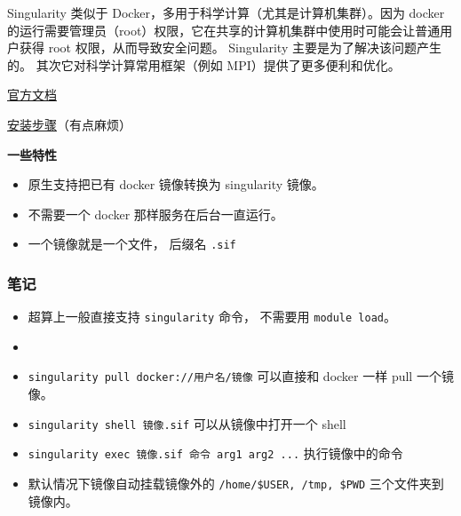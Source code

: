 
\begin{issues}
\issueDraft
\end{issues}

Singularity 类似于 Docker，多用于科学计算（尤其是计算机集群）。因为 docker 的运行需要管理员（root）权限，它在共享的计算机集群中使用时可能会让普通用户获得 root 权限，从而导致安全问题。 Singularity 主要是为了解决该问题产生的。 其次它对科学计算常用框架（例如 MPI）提供了更多便利和优化。

\href{https://docs.sylabs.io/guides/3.0/user-guide/index.html}{官方文档}

\href{https://docs.sylabs.io/guides/3.0/user-guide/quick_start.html#quick-installation-steps}{安装步骤}（有点麻烦）

\textbf{一些特性}
\begin{itemize}
\item 原生支持把已有 docker 镜像转换为 singularity 镜像。
\item 不需要一个 docker 那样服务在后台一直运行。
\item 一个镜像就是一个文件， 后缀名 \verb|.sif|
\end{itemize}


\subsubsection{笔记}
\begin{itemize}
\item 超算上一般直接支持 \verb|singularity| 命令， 不需要用 \verb|module load|。
\item \item \verb|singularity pull docker://用户名/镜像| 可以直接和 docker 一样 pull 一个镜像。
\item \verb|singularity shell 镜像.sif| 可以从镜像中打开一个 shell
\item \verb|singularity exec 镜像.sif 命令 arg1 arg2 ...| 执行镜像中的命令
\item 默认情况下镜像自动挂载镜像外的 \verb|/home/$USER, /tmp, $PWD| 三个文件夹到镜像内。
\end{itemize}
